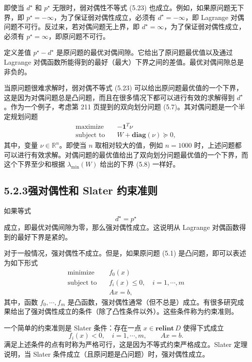 \documentclass[UTF8, 12pt, fontset=fandol, oneside]{ctexart}
\begin{document}
即使当 $d^\star$ 和 $p^\star$ 无限时，弱对偶性不等式 (5.23) 也成立。例如，如果原问题无下界，即 $p^\star=-\infty$，为了保证弱对偶性成立，必须有 $d^\star=-\infty$，即 Lagrange 对偶问题不可行。反过来，若对偶问题无上界，即 $d^\star=\infty$，为了保证弱对偶性成立，必须有 $p^\star=\infty$，即原问题不可行。

定义差值 $p^\star-d^\star$ 是原问题的最优对偶间隙。它给出了原问题最优值以及通过 Lagrange 对偶函数所能得到的最好（最大）下界之间的差值。最优对偶间隙总是非负的。

当原问题很难求解时，弱对偶不等式 (5.23) 可以给出原问题最优值的一个下界，这是因为对偶问题总是凸问题，而且在很多情况下都可以进行有效的求解得到 $d^\star$。作为一个例子，考虑第 211 页提到的双向划分问题 (5.7)。其对偶问题是一个半定规划问题
\[
\begin{aligned}
\text{maximize}\quad & -\mathbf{1}^T\nu\\
\text{subject to}\quad & W+\mathbf{diag}(\nu)\succeq 0,
\end{aligned}
\]
其中，变量 $\nu\in\mathbb{R}^n$。即使当 $n$ 取相对较大的值，例如 $n=1000$ 时，上述问题都可以进行有效求解。对偶问题的最优值给出了双向划分问题最优值的一个下界，而这个下界至少和根据 $\lambda_{\min}(W)$ 给出的下界 (5.8) 一样好。

\subsection*{5.2.3\quad 强对偶性和 Slater 约束准则}

如果等式
\begin{equation}
d^\star=p^\star
\tag{5.24}
\end{equation}
成立，即最优对偶间隙为零，那么强对偶性成立。这说明从 Lagrange 对偶函数得到的最好下界是紧的。

对于一般情况，强对偶性不成立。但是，如果原问题 (5.1) 是凸问题，即可以表述为如下形式
\begin{equation}
\begin{aligned}
\text{minimize}\quad & f_0(x)\\
\text{subject to}\quad & f_i(x)\leq 0,\quad i=1,\cdots,m\\
& Ax=b,
\end{aligned}
\tag{5.25}
\end{equation}
其中，函数 $f_0,\cdots,f_m$ 是凸函数，强对偶性通常（但不总是）成立。有很多研究成果给出了强对偶性成立的条件（除了凸性条件以外）。这些条件称为约束准则。

一个简单的约束准则是 Slater 条件：存在一点 $x\in\mathbf{relint}\,D$ 使得下式成立
\begin{equation}
f_i(x)<0,\quad i=1,\cdots,m,\qquad Ax=b.
\tag{5.26}
\end{equation}
满足上述条件的点有时称为严格可行，这是因为不等式约束严格成立。Slater 定理说明，当 Slater 条件成立（且原问题是凸问题）时，强对偶性成立。
\end{document}
